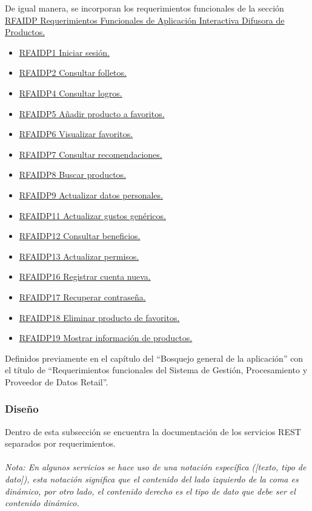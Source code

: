 De igual manera, se incorporan los requerimientos funcionales de la sección
\hyperlink{RFAIDP}{RFAIDP Requerimientos Funcionales de Aplicación Interactiva Difusora de Productos.}
\begin{itemize}
\item \hyperlink{RFAIDP1}{RFAIDP1 Iniciar sesión.}
\item \hyperlink{RFAIDP2}{RFAIDP2 Consultar folletos.}
\item \hyperlink{RFAIDP4}{RFAIDP4 Consultar logros.}
\item \hyperlink{RFAIDP5}{RFAIDP5 Añadir producto a favoritos.}
\item \hyperlink{RFAIDP6}{RFAIDP6 Visualizar favoritos.}
\item \hyperlink{RFAIDP7}{RFAIDP7 Consultar recomendaciones.}
\item \hyperlink{RFAIDP8}{RFAIDP8 Buscar productos.}
\item \hyperlink{RFAIDP9}{RFAIDP9  Actualizar datos personales.}
\item \hyperlink{RFAIDP11}{RFAIDP11 Actualizar gustos genéricos.}
\item \hyperlink{RFAIDP12}{RFAIDP12 Consultar beneficios.}
\item \hyperlink{RFAIDP13}{RFAIDP13 Actualizar permisos.}
\item \hyperlink{RFAIDP16}{RFAIDP16 Registrar cuenta nueva.}
\item \hyperlink{RFAIDP17}{RFAIDP17 Recuperar contraseña.}
\item \hyperlink{RFAIDP18}{RFAIDP18 Eliminar producto de favoritos.}
\item \hyperlink{RFAIDP19}{RFAIDP19 Mostrar información de productos.}
\end{itemize}

Definidos previamente en el capítulo del ``Bosquejo general de la aplicación''  con el título de ``Requerimientos funcionales del Sistema de Gestión, Procesamiento y Proveedor de Datos Retail''. \\ \par

\subsubsection{Diseño}
Dentro de esta subsección se encuentra la documentación de los servicios REST separados por requerimientos. \\ \\
\textit{Nota: En algunos servicios se hace uso de una notación específica ([texto, tipo de dato]), esta notación significa que el contenido del lado izquierdo de la coma es dinámico, por otro lado, el contenido derecho es el tipo de dato que debe ser el contenido dinámico.} 
\\\\

